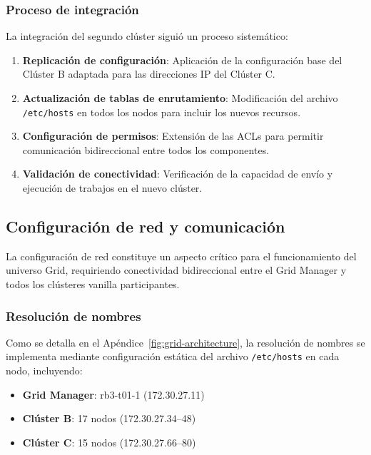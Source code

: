 \subsubsection{Proceso de integración}
\noindent

La integración del segundo clúster siguió un proceso sistemático:

\begin{enumerate}
	\item \textbf{Replicación de configuración}: Aplicación de la configuración base del Clúster B adaptada para las direcciones IP del Clúster C.

	\item \textbf{Actualización de tablas de enrutamiento}: Modificación del archivo \texttt{/etc/hosts} en todos los nodos para incluir los nuevos recursos.

	\item \textbf{Configuración de permisos}: Extensión de las ACLs para permitir comunicación bidireccional entre todos los componentes.

	\item \textbf{Validación de conectividad}: Verificación de la capacidad de envío y ejecución de trabajos en el nuevo clúster.
\end{enumerate}

\subsection{Configuración de red y comunicación}
\noindent

La configuración de red constituye un aspecto crítico para el funcionamiento del universo Grid, requiriendo conectividad bidireccional entre el Grid Manager y todos los clústeres vanilla participantes.

\subsubsection{Resolución de nombres}
\noindent

Como se detalla en el Apéndice~\ref{fig:grid-architecture}, la resolución de nombres se implementa mediante configuración estática del archivo \texttt{/etc/hosts} en cada nodo, incluyendo:

\begin{itemize}
	\item \textbf{Grid Manager}: rb3-t01-1 (172.30.27.11)
	\item \textbf{Clúster B}: 17 nodos (172.30.27.34--48)
	\item \textbf{Clúster C}: 15 nodos (172.30.27.66--80)
\end{itemize}

